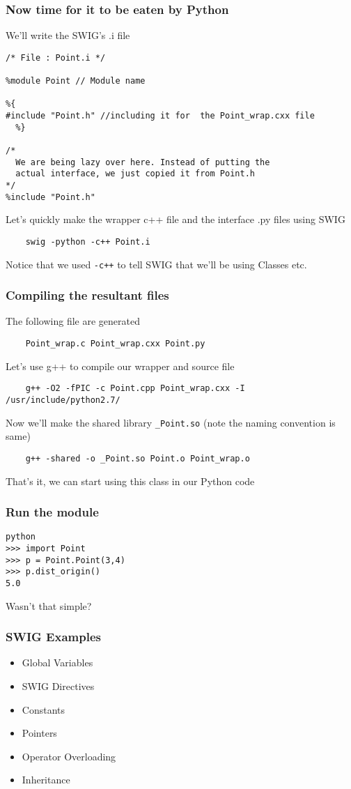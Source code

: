 \documentclass{beamer}
\begin{document}
\begin{frame}[fragile]
\frametitle{Now time for it to be eaten by Python}
\label{sec-3_17}

   We'll write the SWIG's .i file
\begin{verbatim}
/* File : Point.i */

%module Point // Module name

%{
#include "Point.h" //including it for  the Point_wrap.cxx file
  %}

/*
  We are being lazy over here. Instead of putting the
  actual interface, we just copied it from Point.h
*/
%include "Point.h"
\end{verbatim}
   Let's quickly make the wrapper c++ file and the interface .py files using SWIG
\begin{verbatim}
    swig -python -c++ Point.i
\end{verbatim}

   Notice that we used \texttt{-c++} to tell SWIG that we'll be using Classes etc.
\end{frame}
\begin{frame}[fragile]
\frametitle{Compiling the resultant files}
\label{sec-3_18}

   The following file are generated
\begin{verbatim}
    Point_wrap.c Point_wrap.cxx Point.py
\end{verbatim}

   Let's use g++ to compile our wrapper and source file
\begin{verbatim}
    g++ -O2 -fPIC -c Point.cpp Point_wrap.cxx -I /usr/include/python2.7/
\end{verbatim}

   Now we'll make the shared library \texttt{\_Point.so} (note the naming convention is same)
\begin{verbatim}
    g++ -shared -o _Point.so Point.o Point_wrap.o 
\end{verbatim}

   That's it, we can start using this class in our Python code
\end{frame}
\begin{frame}[fragile]
\frametitle{Run the module}
\label{sec-3_19}

\begin{verbatim}
python
>>> import Point
>>> p = Point.Point(3,4)
>>> p.dist_origin()
5.0
\end{verbatim}
   Wasn't that simple?
\end{frame}
\begin{frame}
\frametitle{SWIG Examples}
\label{sec-3_20}


\begin{itemize}
\item Global Variables
\item SWIG Directives
\item Constants
\item Pointers
\item Operator Overloading
\item Inheritance
\end{itemize}



   
   
\end{frame}
\end{document}
